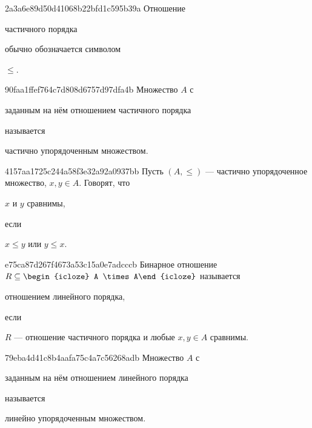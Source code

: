 \begin{note}{2a3a6e89d50d41068b22bfd1c595b39a}
    Отношение \begin{icloze}{2}частичного порядка\end{icloze} обычно обозначается символом \begin{icloze}{1}\({ \leqslant }\).\end{icloze}
\end{note}

\begin{note}{90faa1ffef764c7d808d6757d97dfa4b}
    Множество \({ A }\) с \begin{icloze}{2}заданным на нём отношением частичного порядка\end{icloze} называется \begin{icloze}{1}частично упорядоченным множеством.\end{icloze}
\end{note}

\begin{note}{4157aa1725c244a58f3e32a92a0937bb}
    Пусть \({ (A, \leqslant) }\) --- частично упорядоченное множество, \({ x, y \in A }\).
    Говорят, что \begin{icloze}{2}\({ x }\) и \({ y }\) сравнимы,\end{icloze} если \begin{icloze}{1}\({ x \leqslant y }\) или \({ y \leqslant x }\).\end{icloze}
\end{note}

\begin{note}{e75ca87d267f4673a53c15a0e7adcccb}
    Бинарное отношение \({ R \subseteq \begin{icloze}{3}A \times A\end{icloze} }\) называется \begin{icloze}{2}отношением линейного порядка,\end{icloze} если \begin{icloze}{1}\({ R }\) --- отношение частичного порядка и любые \({ x, y \in A }\) сравнимы.\end{icloze}
\end{note}

\begin{note}{79eba4d41c8b4aafa75c4a7c56268adb}
    Множество \({ A }\) с \begin{icloze}{2}заданным на нём отношением линейного порядка\end{icloze} называется \begin{icloze}{1}линейно упорядоченным множеством.\end{icloze}
\end{note}


